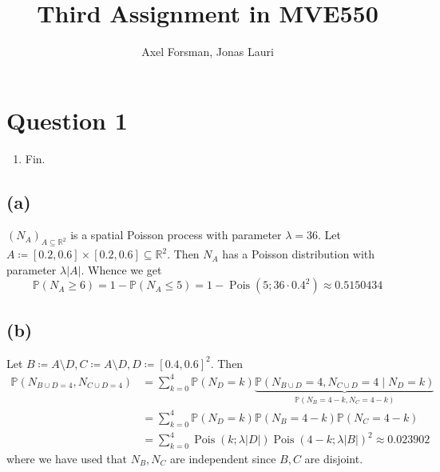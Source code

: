 \documentclass{article}
\title{Third Assignment in MVE550}
\author{Axel Forsman, Jonas Lauri}
\DeclareMathOperator\Poisson{Pois}
\newcommand{\size}[1]{\lvert #1 \rvert}
\begin{document}

\section{Question 1}
\begin{enumerate}[label=(\alph*)]
	\item Fin.
\end{enumerate}

\subsection{(a)}
$(N_A)_{A \subseteq \mathbb R^2}$ is a spatial Poisson process
with parameter $\lambda = 36$.
Let $A \coloneqq [0.2, 0.6] \times [0.2, 0.6] \subseteq \mathbb R^2$.
Then $N_A$ has a Poisson distribution with parameter $\lambda \lvert A \rvert$.
Whence we get
$$ \mathbb P(N_A \ge 6) = 1 - \mathbb P(N_A \le 5) = 1 - \Poisson(5; 36 \cdot 0.4^2)
\approx \num{0.5150434} $$

\subsection{(b)}
\begin{center}
\end{center}

Let $B \coloneqq A \setminus D, C \coloneqq A \setminus D, D \coloneqq [0.4, 0.6]^2$.
Then
\begin{align*}
	\mathbb P(N_{B \cup D = 4}, N_{C \cup D = 4}) &= \sum_{k=0}^4 \mathbb P(N_D = k) \underbrace{\mathbb P(N_{B \cup D} = 4, N_{C \cup D} = 4 \mid N_D = k)}_{\mathbb P(N_B = 4 - k, N_C = 4 - k)} \\
												  &= \sum_{k=0}^4 \mathbb P(N_D = k) \mathbb P(N_B = 4 - k) \mathbb P(N_C = 4 - k) \\
												  &= \sum_{k=0}^4 \Poisson(k; \lambda \size{D}) \Poisson(4 - k; \lambda \size{B})^2
												  \approx \num{0.023902}
\end{align*}
where we have used that $N_B, N_C$ are independent since $B, C$ are disjoint.
\end{document}
